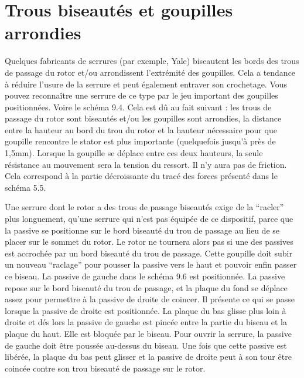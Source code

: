 \documentclass[a4paper,french,11pt,twoside]{report}
\begin{document}
\section{Trous biseautés et goupilles arrondies}

Quelques fabricants de serrures (par exemple, Yale) biseautent les bords des trous de passage du rotor et/ou arrondissent l'extrémité des goupilles. Cela a tendance à réduire l'usure de la serrure et peut également entraver son crochetage. Vous pouvez reconnaître une serrure de ce type par le jeu important des goupilles positionnées. Voire le schéma 9.4. Cela est dû au fait suivant : les trous de passage du rotor sont biseautés et/ou les goupilles sont arrondies, la distance entre la hauteur au bord du trou du rotor et la hauteur nécessaire pour que goupille rencontre le stator est plus importante (quelquefois jusqu'à près de 1,5mm). Lorsque la goupille se déplace entre ces deux hauteurs, la seule résistance au mouvement sera la tension du ressort. Il n'y aura pas de friction. Cela correspond à la partie décroissante du tracé des forces présenté dans le schéma 5.5.

Une serrure dont le rotor a des trous de passage biseautés exige de la \enquote{racler} plus longuement, qu'une serrure qui n'est pas équipée de ce dispositif, parce que la passive se positionne sur le bord biseauté du trou de passage au lieu de se placer sur le sommet du rotor. Le rotor ne tournera alors pas si une des passives est accrochée par un bord biseauté du trou de passage. Cette goupille doit subir un nouveau \enquote{raclage} pour pousser la passive vers le haut et pouvoir enfin passer ce biseau. La passive de gauche dans le schéma 9.6 est positionnée. La passive repose sur le bord biseauté du trou de passage, et la plaque du fond se déplace assez pour permettre à la passive de droite de coincer. Il présente ce qui se passe lorsque la passive de droite est positionnée. La plaque du bas glisse plus loin à droite et dés lors la passive de gauche est pincée entre la partie du biseau et la plaque du haut. Elle est bloquée par le biseau. Pour ouvrir la serrure, la passive de gauche doit être poussée au-dessus du biseau. Une fois que cette passive est libérée, la plaque du bas peut glisser et la passive de droite peut à son tour être coincée contre son trou biseauté de passage sur le rotor.
\end{document}

